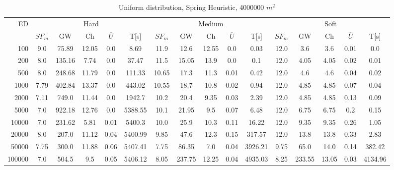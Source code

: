 \begin{table}[htb]
	\centering
	\begin{tabular}{|r|c|c|c|c|c|c|c|c|c|c|c|c|c|c|c|} 
		\multirow{2}{*}{ED} & \multicolumn{5}{c|}{Hard} & \multicolumn{5}{c|}{Medium} &\multicolumn{5}{c|}{Soft} \\ 
		\cline{2-16} 
		&$SF_{m}$&GW & Ch & $\overline{U}$&T[s] &$SF_{m}$&GW & Ch & $\overline{U}$ &T[s] &$SF_{m}$&GW & Ch & $\overline{U}$  & T[s]  \\ 
		\hline 
		100 & 9.0 & 75.89 & 12.05 & 0.0 & 8.69 & 11.9 & 12.6 & 12.55 & 0.0 & 0.03 & 12.0 & 3.6 & 3.6 & 0.01 & 0.0\\ 
		200 & 8.0 & 135.16 & 7.74 & 0.0 & 37.47 & 11.5 & 15.05 & 13.9 & 0.0 & 0.1 & 12.0 & 4.05 & 4.05 & 0.02 & 0.01\\ 
		500 & 8.0 & 248.68 & 11.79 & 0.0 & 111.33 & 10.65 & 17.3 & 11.3 & 0.01 & 0.42 & 12.0 & 4.6 & 4.6 & 0.04 & 0.02\\ 
		1000 & 7.79 & 402.84 & 13.37 & 0.0 & 443.02 & 10.55 & 18.7 & 10.8 & 0.02 & 0.94 & 12.0 & 4.85 & 4.85 & 0.07 & 0.04\\ 
		2000 & 7.11 & 749.0 & 11.44 & 0.0 & 1942.7 & 10.2 & 20.4 & 9.35 & 0.03 & 2.39 & 12.0 & 4.85 & 4.85 & 0.13 & 0.09\\ 
		5000 & 7.0 & 922.18 & 12.76 & 0.0 & 5388.55 & 10.1 & 21.95 & 9.5 & 0.07 & 6.48 & 12.0 & 6.75 & 6.75 & 0.2 & 0.15\\ 
		10000 & 7.0 & 231.62 & 5.81 & 0.01 & 5400.3 & 10.0 & 25.9 & 10.3 & 0.11 & 16.22 & 12.0 & 9.35 & 9.35 & 0.26 & 1.05\\ 
		20000 & 8.0 & 207.0 & 11.12 & 0.04 & 5400.99 & 9.85 & 47.6 & 12.3 & 0.15 & 317.57 & 12.0 & 13.8 & 13.8 & 0.33 & 2.83\\ 
		50000 & 7.75 & 300.0 & 11.88 & 0.06 & 5407.41 & 7.75 & 86.35 & 7.0 & 0.04 & 3926.21 & 9.75 & 65.0 & 14.0 & 0.14 & 382.42\\ 
		100000 & 7.0 & 504.5 & 9.5 & 0.05 & 5406.12 & 8.05 & 237.75 & 12.25 & 0.04 & 4935.03 & 8.25 & 233.55 & 13.05 & 0.03 & 4134.96\\ 
		\hline 
	\end{tabular} 
	\caption{Uniform distribution, Spring Heuristic, 4000000 $m^2$} 
	\label{tab:UnRandom2000} 
\end{table} 
